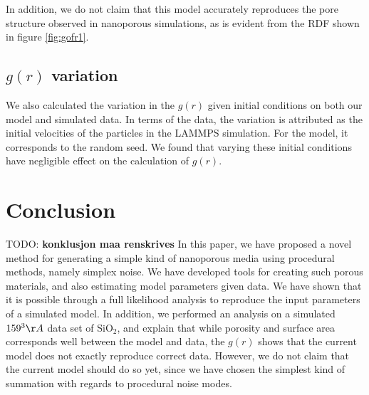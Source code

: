 \documentclass[aps,pre,twocolumn,letterpaper,floatfix,showpacs]{revtex4}
\newcommand{\todo}[1]{ {\color{Magenta} TODO: \color{Blue} \textbf{#1} }}
\begin{document}
In addition, we do not claim that this model accurately reproduces the pore structure observed in nanoporous simulations, as is evident from the RDF shown in figure \ref{fig:gofr1}.

\subsection{$g(r)$ variation}
We also calculated the variation in the $g(r)$ given initial conditions on both our model and simulated data. In terms of the data, the variation is attributed as the initial velocities of the particles in the LAMMPS simulation. For the model, it corresponds to the random seed. We found that varying these initial conditions have negligible effect on the calculation of $g(r)$.





\section{Conclusion}
\todo{konklusjon maa renskrives}
In this paper, we have proposed a novel method for generating a simple kind of nanoporous media using procedural methods, namely simplex noise. We have developed tools for creating such porous materials, and also estimating model parameters given data. We have shown that it is possible through a full likelihood analysis to reproduce the input parameters of a simulated model. In addition, we performed an analysis on a simulated $159^3 \AA$ data set of SiO$_2$, and explain that while porosity and surface area corresponds well between the model and data, the $g(r)$ shows that the current model does not exactly reproduce correct data. However, we do not claim that the current model should do so yet, since we have chosen the simplest kind of summation with regards to procedural noise modes. 
\end{document}
